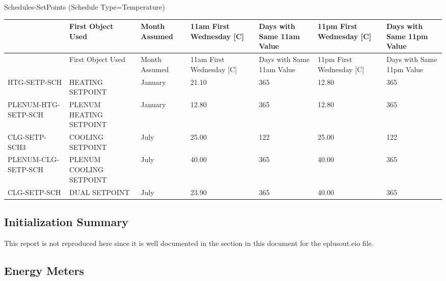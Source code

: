 Schedules-SetPoints (Schedule Type=Temperature)

\begin{longtable}[c]{>{\raggedright}p{0.85in}>{\raggedright}p{0.85in}>{\raggedright}p{0.85in}>{\raggedright}p{0.85in}>{\raggedright}p{0.85in}>{\raggedright}p{0.85in}>{\raggedright}p{0.85in}}
\toprule 
 & First Object Used     & Month Assumed & 11am First Wednesday [C] & Days with Same 11am Value & 11pm First Wednesday [C] & Days with Same 11pm Value \tabularnewline
\midrule
\endfirsthead

\toprule 
 & First Object Used     & Month Assumed & 11am First Wednesday [C] & Days with Same 11am Value & 11pm First Wednesday [C] & Days with Same 11pm Value \tabularnewline
\midrule
\endhead

    HTG-SETP-SCH       & HEATING SETPOINT       & January       &        21.10             &          365              &        12.80             &          365              \tabularnewline
    PLENUM-HTG-SETP-SCH & PLENUM HEATING SETPOINT & January       &        12.80             &          365              &        12.80             &          365              \tabularnewline
    CLG-SETP-SCH3      & COOLING SETPOINT       & July          &        25.00             &          122              &        25.00             &          122              \tabularnewline
    PLENUM-CLG-SETP-SCH & PLENUM COOLING SETPOINT & July          &        40.00             &          365              &        40.00             &          365              \tabularnewline
    CLG-SETP-SCH       & DUAL SETPOINT          & July          &        23.90             &          365              &        40.00             &          365              \tabularnewline

\bottomrule
\end{longtable}



\subsection{Initialization Summary}\label{initializatin-summary}

This report is not reproduced here since it is well documented in the section in this document for the eplusout.eio file.

\subsection{Energy Meters}\label{energy-meters}

